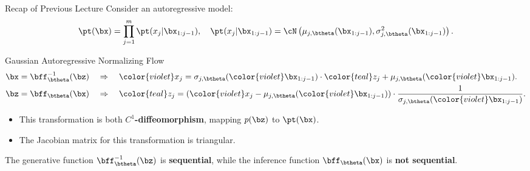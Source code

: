 \documentclass{beamer}
\begin{document}
\begin{frame}{Recap of Previous Lecture}
	Consider an autoregressive model:
	\vspace{-0.3cm}
	{\small
		\[
		\pt(\bx) = \prod_{j=1}^m \pt(x_j | \bx_{1:j - 1}), \quad
		\pt(x_j | \bx_{1:j - 1}) = \cN \left(\mu_{j, \btheta}(\bx_{1:j-1}), \sigma^2_{j, \btheta} (\bx_{1:j-1})\right).
		\]
	}
	\vspace{-0.5cm}
	\begin{block}{Gaussian Autoregressive Normalizing Flow}
		\vspace{-0.5cm}
		\begin{align*}
			\bx &= \bff^{-1}_{\btheta}(\bz) \quad \Rightarrow \quad {\color{violet} x_j} = \sigma_{j, \btheta} ({\color{violet} \bx_{1:j-1}}) \cdot {\color{teal} z_j} + \mu_{j, \btheta}({\color{violet} \bx_{1:j-1}}). \\
			\bz &= \bff_{\btheta}(\bx) \quad \Rightarrow \quad {\color{teal} z_j} = \left({\color{violet}x_j} - \mu_{j, \btheta}({\color{violet}\bx_{1:j-1}}) \right) \cdot \frac{1}{ \sigma_{j, \btheta} ({\color{violet}\bx_{1:j-1}})}.
		\end{align*}
		\vspace{-0.5cm}
	\end{block}
	\begin{itemize}
		\item This transformation is both \textbf{$C^1$-diffeomorphism}, mapping $p(\bz)$ to $\pt(\bx)$.
		\item The Jacobian matrix for this transformation is triangular.
	\end{itemize}
	The generative function $\bff^{-1}_{\btheta}(\bz)$ is \textbf{sequential}, while the inference function $\bff_{\btheta}(\bx)$ is \textbf{not sequential}.
\end{frame}
\end{document}
